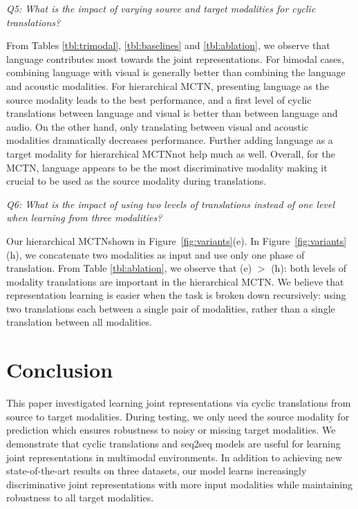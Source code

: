 \documentclass[letterpaper]{article} %
\newcommand{\ours}{MCTN}
\begin{document}
\textit{Q5: What is the impact of varying source and target modalities for cyclic translations?}

From Tables \ref{tbl:trimodal}, \ref{tbl:baselines} and \ref{tbl:ablation}, we observe that language contributes most towards the joint representations. For bimodal cases, combining language with visual is generally better than combining the language and acoustic modalities. For hierarchical \ours, presenting language as the source modality leads to the best performance, and a first level of cyclic translations between language and visual is better than between language and audio. On the other hand, only translating between visual and acoustic modalities dramatically decreases performance. Further adding language as a target modality for hierarchical \ours \will not help much as well. Overall, for the \ours, language appears to be the most discriminative modality making it crucial to be used as the source modality during translations.

\textit{Q6: What is the impact of using two levels of translations instead of one level when learning from three modalities?}

Our hierarchical \ours \is shown in Figure~\ref{fig:variants}(e). In Figure~\ref{fig:variants}(h), we concatenate two modalities as input and use only one phase of translation. From Table \ref{tbl:ablation}, we observe that (e) $>$ (h): both levels of modality translations are important in the hierarchical \ours. We believe that representation learning is easier when the task is broken down recursively: using two translations each between a single pair of modalities, rather than a single translation between all modalities.

\section{Conclusion}
This paper investigated learning joint representations via cyclic translations from source to target modalities. During testing, we only need the source modality for prediction which ensures robustness to noisy or missing target modalities. We demonstrate that cyclic translations and seq2seq models are useful for learning joint representations in multimodal environments. In addition to achieving new state-of-the-art results on three datasets, our model learns increasingly discriminative joint representations with more input modalities while maintaining robustness to all target modalities.
\end{document}
